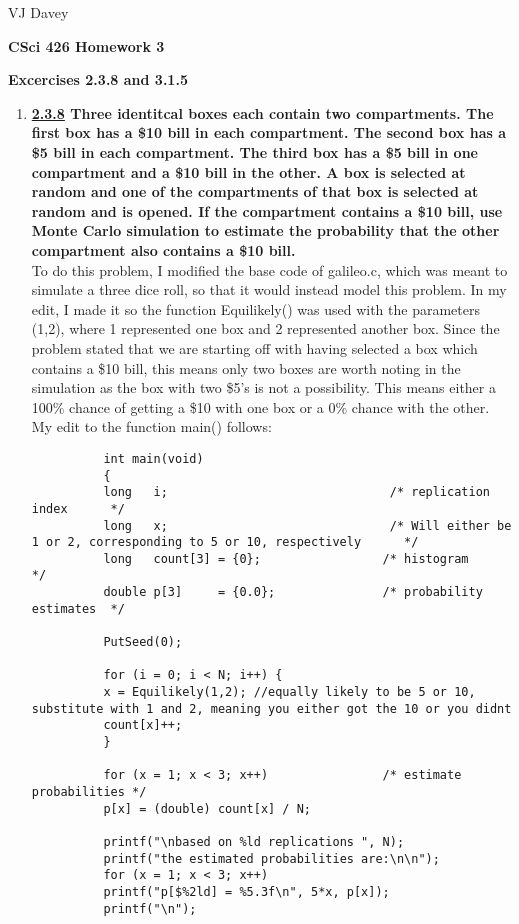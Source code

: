 \documentclass[11pt]{article}
\begin{document}
\centerline{VJ Davey}\vskip 0.10cm
\begin{LARGE}
\centerline {\bf CSci 426 Homework 3}
\end{LARGE}
\vskip 0.25cm
\centerline{\bf Excercises 2.3.8 and 3.1.5}
\begin{enumerate}
\item \textbf{\underline{2.3.8} Three identitcal boxes each contain two compartments. The first box has a \$10 bill in each compartment. The second box has a \$5 bill in each compartment. The third box has a \$5 bill in one compartment and a \$10 bill in the other. A box is selected at random and one of the compartments of that box is selected at random and is opened. If the compartment contains a \$10 bill, use Monte Carlo simulation to estimate the probability that the other compartment also contains a \$10 bill.}
		\\To do this problem, I modified the base code of galileo.c, which was meant to simulate a three dice roll, so that it would instead model this problem. In my edit, I made it so the function Equilikely() was used with the parameters (1,2), where 1 represented one box and 2 represented another box. Since the problem stated that we are starting off with having selected a box which contains a \$10 bill, this means only two boxes are worth noting in the simulation as the box with two \$5's is not a possibility. This means either a 100\% chance of getting a \$10 with one box or a 0\% chance with the other. My edit to the function main() follows:
		\begin{verbatim}
		  int main(void)
		  {
		  long   i;                               /* replication index      */
		  long   x;                               /* Will either be 1 or 2, corresponding to 5 or 10, respectively      */
		  long   count[3] = {0};                 /* histogram              */
		  double p[3]     = {0.0};               /* probability estimates  */
		  
		  PutSeed(0);
		  
		  for (i = 0; i < N; i++) {
		  x = Equilikely(1,2); //equally likely to be 5 or 10, substitute with 1 and 2, meaning you either got the 10 or you didnt
		  count[x]++;
		  }
		  
		  for (x = 1; x < 3; x++)                /* estimate probabilities */
		  p[x] = (double) count[x] / N;
		  
		  printf("\nbased on %ld replications ", N);
		  printf("the estimated probabilities are:\n\n");
		  for (x = 1; x < 3; x++)
		  printf("p[$%2ld] = %5.3f\n", 5*x, p[x]);
		  printf("\n");
		  

\end{verbatim}
\end{enumerate}
\end{document}

